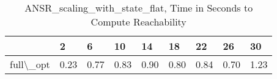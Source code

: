 \begin{table}
\centering
\caption{ANSR\_scaling\_with\_state\_flat, Time in Seconds to Compute Reachability}
\label{ANSR_scaling_with_state_flat_states_time}
\begin{tabular}{lllllllll}
\toprule
{} &     2 &     6 &    10 &    14 &    18 &    22 &    26 &    30 \\
\midrule
full\textbackslash \_opt &  0.23 &  0.77 &  0.83 &  0.90 &  0.80 &  0.84 &  0.70 &  1.23 \\
\bottomrule
\end{tabular}
\end{table}
